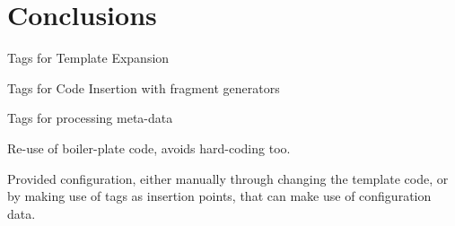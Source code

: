 \documentclass{llncs}%
\begin{document}
%
\section{Conclusions}
Tags for Template Expansion

Tags for Code Insertion with fragment generators

Tags for processing meta-data

Re-use of boiler-plate code, avoids hard-coding too.

Provided configuration, either manually through changing the template code, or by making use of tags as insertion points, that can make use of configuration data.
%


%
%
%
\end{document}
